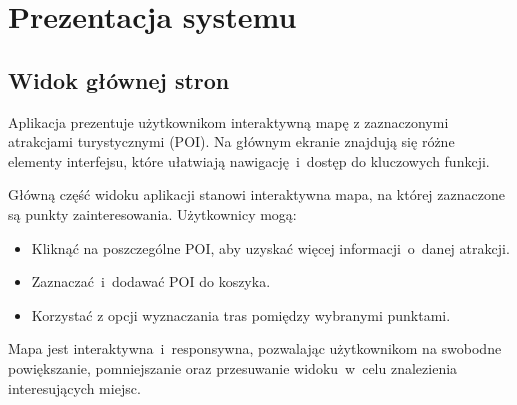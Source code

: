 
\chapter{Prezentacja systemu}
\label{ch:prezentacja-systemu}



\section{Widok głównej stron}
\label{sec:mapawidok}

Aplikacja prezentuje użytkownikom interaktywną mapę z zaznaczonymi atrakcjami turystycznymi (POI). 
Na głównym ekranie znajdują się różne elementy interfejsu, które ułatwiają nawigację~i~dostęp do kluczowych funkcji.

Główną część widoku aplikacji stanowi interaktywna mapa, na której zaznaczone są punkty zainteresowania. Użytkownicy mogą:
\begin{itemize}
 \item   Kliknąć na poszczególne POI, aby uzyskać więcej informacji~o~danej atrakcji.
 \item   Zaznaczać~i~dodawać POI do koszyka.
 \item  Korzystać z opcji wyznaczania tras pomiędzy wybranymi punktami.
\end{itemize}
Mapa jest interaktywna~i~responsywna, pozwalając użytkownikom na swobodne powiększanie, pomniejszanie oraz przesuwanie widoku~w~celu znalezienia interesujących miejsc.

